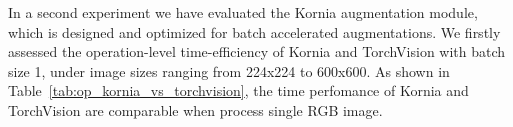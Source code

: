 In a  second experiment we have evaluated the  Kornia augmentation module, which is designed and optimized for batch accelerated augmentations. We firstly assessed the operation-level time-efficiency of Kornia and TorchVision with batch size 1, under   image sizes ranging from 224x224 to 600x600. As shown in Table~\ref{tab:op_kornia_vs_torchvision}, the time perfomance of Kornia and TorchVision are comparable when process single RGB image. 

